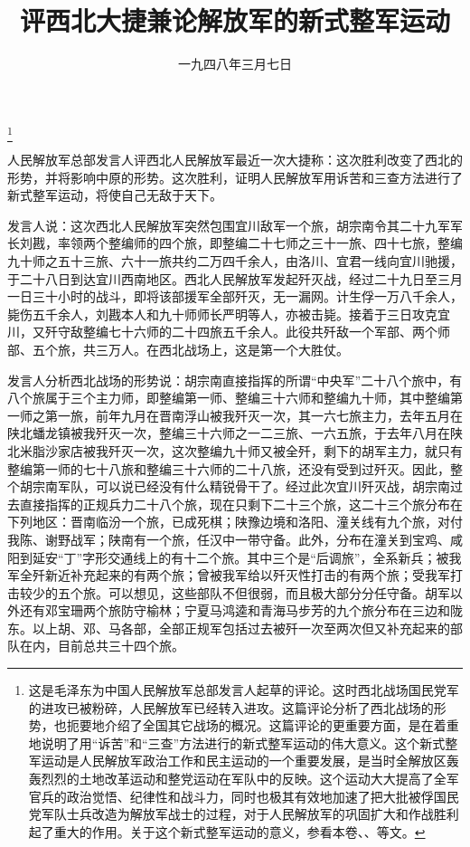 
\title{评西北大捷兼论解放军的新式整军运动}
\date{一九四八年三月七日}
\thanks{这是毛泽东为中国人民解放军总部发言人起草的评论。这时西北战场国民党军的进攻已被粉碎，人民解放军已经转入进攻。这篇评论分析了西北战场的形势，也扼要地介绍了全国其它战场的概况。这篇评论的更重要方面，是在着重地说明了用“诉苦”和“三查”方法进行的新式整军运动的伟大意义。这个新式整军运动是人民解放军政治工作和民主运动的一个重要发展，是当时全解放区轰轰烈烈的土地改革运动和整党运动在军队中的反映。这个运动大大提高了全军官兵的政治觉悟、纪律性和战斗力，同时也极其有效地加速了把大批被俘国民党军队士兵改造为解放军战士的过程，对于人民解放军的巩固扩大和作战胜利起了重大的作用。关于这个新式整军运动的意义，参看本卷、、等文。}
\maketitle


人民解放军总部发言人评西北人民解放军最近一次大捷称：这次胜利改变了西北的形势，并将影响中原的形势。这次胜利，证明人民解放军用诉苦和三查方法进行了新式整军运动，将使自己无敌于天下。

发言人说：这次西北人民解放军突然包围宜川敌军一个旅，胡宗南令其二十九军军长刘戡，率领两个整编师的四个旅，即整编二十七师之三十一旅、四十七旅，整编九十师之五十三旅、六十一旅共约二万四千余人，由洛川、宜君一线向宜川驰援，于二十八日到达宜川西南地区。西北人民解放军发起歼灭战，经过二十九日至三月一日三十小时的战斗，即将该部援军全部歼灭，无一漏网。计生俘一万八千余人，毙伤五千余人，刘戡本人和九十师师长严明等人，亦被击毙。接着于三日攻克宜川，又歼守敌整编七十六师的二十四旅五千余人。此役共歼敌一个军部、两个师部、五个旅，共三万人。在西北战场上，这是第一个大胜仗。

发言人分析西北战场的形势说：胡宗南直接指挥的所谓“中央军”二十八个旅中，有八个旅属于三个主力师，即整编第一师、整编三十六师和整编九十师，其中整编第一师之第一旅，前年九月在晋南浮山被我歼灭一次，其一六七旅主力，去年五月在陕北蟠龙镇被我歼灭一次，整编三十六师之一二三旅、一六五旅，于去年八月在陕北米脂沙家店被我歼灭一次，这次整编九十师又被全歼，剩下的胡军主力，就只有整编第一师的七十八旅和整编三十六师的二十八旅，还没有受到过歼灭。因此，整个胡宗南军队，可以说已经没有什么精锐骨干了。经过此次宜川歼灭战，胡宗南过去直接指挥的正规兵力二十八个旅，现在只剩下二十三个旅，这二十三个旅分布在下列地区：晋南临汾一个旅，已成死棋；陕豫边境和洛阳、潼关线有九个旅，对付我陈、谢野战军；陕南有一个旅，任汉中一带守备。此外，分布在潼关到宝鸡、咸阳到延安“丁”字形交通线上的有十二个旅。其中三个是“后调旅”，全系新兵；被我军全歼新近补充起来的有两个旅；曾被我军给以歼灭性打击的有两个旅；受我军打击较少的五个旅。可以想见，这些部队不但很弱，而且极大部分分任守备。胡军以外还有邓宝珊两个旅防守榆林；宁夏马鸿逵和青海马步芳的九个旅分布在三边和陇东。以上胡、邓、马各部，全部正规军包括过去被歼一次至两次但又补充起来的部队在内，目前总共三十四个旅。

